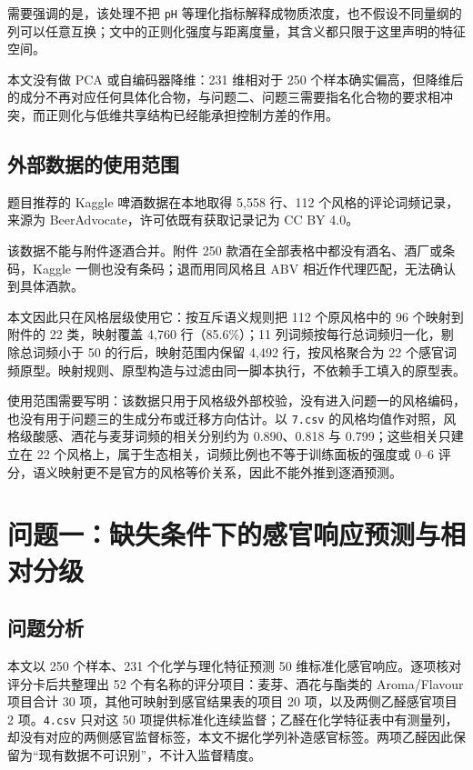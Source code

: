 \documentclass[UTF8,a4paper,zihao=-4]{ctexart}
\numberwithin{figure}{section}
\numberwithin{table}{section}
\numberwithin{equation}{section}
\newcommand{\file}[1]{\texttt{#1}}
\begin{document}
需要强调的是，该处理不把 \file{pH} 等理化指标解释成物质浓度，也不假设不同量纲的列可以任意互换；文中的正则化强度与距离度量，其含义都只限于这里声明的特征空间。

本文没有做 PCA 或自编码器降维：231 维相对于 250 个样本确实偏高，但降维后的成分不再对应任何具体化合物，与问题二、问题三需要指名化合物的要求相冲突，而正则化与低维共享结构已经能承担控制方差的作用。

\subsection{外部数据的使用范围}

题目推荐的 Kaggle 啤酒数据\cite{polozoff}在本地取得 5{,}558 行、112 个风格的评论词频记录，来源为 BeerAdvocate，许可依既有获取记录记为 CC BY 4.0。

该数据不能与附件逐酒合并。附件 250 款酒在全部表格中都没有酒名、酒厂或条码，Kaggle 一侧也没有条码；退而用同风格且 ABV 相近作代理匹配，无法确认到具体酒款。

本文因此只在风格层级使用它：按互斥语义规则把 112 个原风格中的 96 个映射到附件的 22 类，映射覆盖 4{,}760 行（85.6\%）；11 列词频按每行总词频归一化，剔除总词频小于 50 的行后，映射范围内保留 4{,}492 行，按风格聚合为 22 个感官词频原型。映射规则、原型构造与过滤由同一脚本执行，不依赖手工填入的原型表。

使用范围需要写明：该数据只用于风格级外部校验，没有进入问题一的风格编码，也没有用于问题三的生成分布或迁移方向估计。以 \file{7.csv} 的风格均值作对照，风格级酸感、酒花与麦芽词频的相关分别约为 0.890、0.818 与 0.799；这些相关只建立在 22 个风格上，属于生态相关，词频比例也不等于训练面板的强度或 0--6 评分，语义映射更不是官方的风格等价关系，因此不能外推到逐酒预测。

\section{问题一：缺失条件下的感官响应预测与相对分级}
\label{sec:q1}

\subsection{问题分析}

本文以 250 个样本、231 个化学与理化特征预测 50 维标准化感官响应。逐项核对评分卡后共整理出 52 个有名称的评分项目：麦芽、酒花与酯类的 Aroma/Flavour 项目合计 30 项，其他可映射到感官结果表的项目 20 项，以及两侧乙醛感官项目 2 项。\file{4.csv} 只对这 50 项提供标准化连续监督；乙醛在化学特征表中有测量列，却没有对应的两侧感官监督标签，本文不据化学列补造感官标签。两项乙醛因此保留为“现有数据不可识别”，不计入监督精度。
\end{document}

